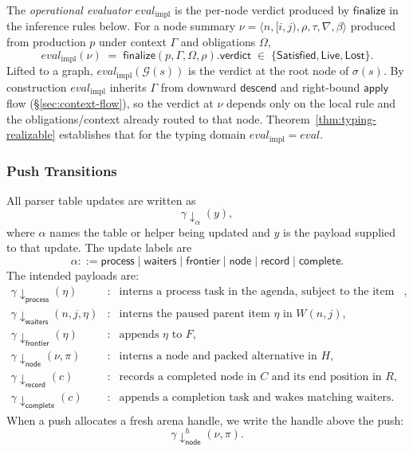 \begin{definition}
\label{def:eval-impl}
The \emph{operational evaluator} $\mathit{eval}_{\mathrm{impl}}$ is the per-node verdict produced by $\mathsf{finalize}$ in the inference rules below. For a node summary $\nu=\langle n,[i,j),\rho,\tau,\nabla,\beta\rangle$ produced from production $p$ under context $\Gamma$ and obligations $\Omega$,
\[
  \mathit{eval}_{\mathrm{impl}}(\nu)\;=\;\mathsf{finalize}(p,\Gamma,\Omega,\rho).\mathsf{verdict}
  \;\in\;\{\mathsf{Satisfied},\mathsf{Live},\mathsf{Lost}\}.
\]
Lifted to a graph, $\mathit{eval}_{\mathrm{impl}}(\mathcal G(s))$ is the verdict at the root node of $\sigma(s)$. By construction $\mathit{eval}_{\mathrm{impl}}$ inherits $\Gamma$ from downward $\mathsf{descend}$ and right-bound $\mathsf{apply}$ flow (\S\ref{sec:context-flow}), so the verdict at $\nu$ depends only on the local rule and the obligations/context already routed to that node. Theorem~\ref{thm:typing-realizable} establishes that for the typing domain $\mathit{eval}_{\mathrm{impl}} = \mathit{eval}$.
\end{definition}

\subsubsection{Push Transitions}

All parser table updates are written as
\[
\gamma \downarrow_{\alpha}(y),
\]
where $\alpha$ names the table or helper being updated and $y$ is the payload supplied to that update. The update labels are
\[
\alpha ::=
\mathsf{process}
\mid
\mathsf{waiters}
\mid
\mathsf{frontier}
\mid
\mathsf{node}
\mid
\mathsf{record}
\mid
\mathsf{complete}.
\]
The intended payloads are:
\[
\begin{array}{rcl}
\gamma \downarrow_{\mathsf{process}}(\eta)
&:&
\text{interns a process task in the agenda, subject to the item key},
\\[0.25em]

\gamma \downarrow_{\mathsf{waiters}}(n,j,\eta)
&:&
\text{interns the paused parent item }\eta\text{ in }W(n,j),
\\[0.25em]

\gamma \downarrow_{\mathsf{frontier}}(\eta)
&:&
\text{appends }\eta\text{ to }F,
\\[0.25em]

\gamma \downarrow_{\mathsf{node}}(\nu,\pi)
&:&
\text{interns a node and packed alternative in }H,
\\[0.25em]

\gamma \downarrow_{\mathsf{record}}(c)
&:&
\text{records a completed node in }C\text{ and its end position in }R,
\\[0.25em]

\gamma \downarrow_{\mathsf{complete}}(c)
&:&
\text{appends a completion task and wakes matching waiters.}
\end{array}
\]
When a push allocates a fresh arena handle, we write the handle above the push:
\[
\gamma {\downarrow}^h_{\mathsf{node}}(\nu,\pi).
\]

